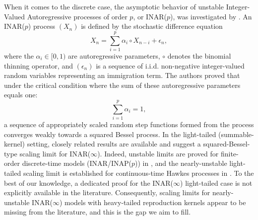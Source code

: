 \documentclass[letterpaper]{article}
\numberwithin{equation}{section}
\theoremstyle{definition}
\theoremstyle{remark}
\begin{document}
When it comes to the discrete case, the asymptotic behavior of unstable Integer-Valued Autoregressive processes of order $p$, or INAR($p$), was investigated by \cite{barczy2011asymptotic}. An INAR($p$) process $(X_n)$ is defined by the stochastic difference equation 
\[
    X_n = \sum_{i=1}^p \alpha_i \circ X_{n-i} + \epsilon_n,
\]
where the $\alpha_i \in [0, 1)$ are autoregressive parameters, $\circ$ denotes the binomial thinning operator, and $(\epsilon_n)$ is a sequence of i.i.d. non-negative integer-valued random variables representing an immigration term. The authors proved that under the critical condition where the sum of these autoregressive parameters equals one:
\[
  \sum_{i=1}^p\alpha_i=1,
\]
a sequence of appropriately scaled random step functions formed from the process converges weakly towards a squared Bessel process. {
In the light-tailed (summable-kernel) setting, closely related results are available and suggest a squared-Bessel-type scaling limit for INAR($\infty$).
Indeed, unstable limits are proved for finite-order discrete-time models (INAR/INAP($p$)) in \cite{barczy2011asymptotic}, and the nearly-unstable light-tailed scaling limit is established for continuous-time Hawkes processes in \cite{jaisson2015limit}.
To the best of our knowledge, a dedicated proof for the INAR($\infty$) light-tailed case is not explicitly available in the literature.
Consequently, scaling limits for nearly-unstable INAR($\infty$) models with heavy-tailed reproduction kernels appear to be missing from the literature, and this is the gap we aim to fill.}
\end{document}
